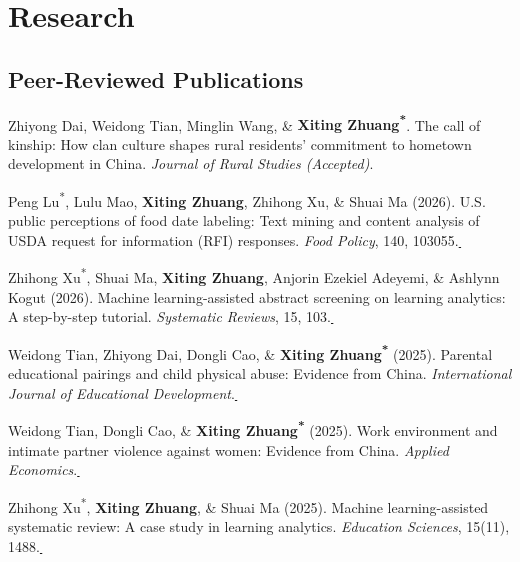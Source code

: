 \documentclass[10.8 pt,letterpaper]{article}
\newcommand{\corrauthor}{\textsuperscript{*}}
\newcommand{\paperlink}[1]{\href{#1}{\,\small\faExternalLink}}
\renewenvironment{itemize}{
	\begin{list}{}{
			\setlength{\leftmargin}{1.5em}
		}
	}{
	\end{list}
}
\begin{document}
	\section*{\textbf{Research}}
	
	\subsection*{\textbf{Peer-Reviewed Publications}}
	\begin{itemize}
		
		\item[-] Zhiyong Dai, Weidong Tian, Minglin Wang, \& \textbf{Xiting Zhuang\corrauthor}. The call of kinship: How clan culture shapes rural residents' commitment to hometown development in China. \emph{\textit{Journal of Rural Studies} (Accepted)}.
				
				
		\item[-] Peng Lu\corrauthor, Lulu Mao, \textbf{Xiting Zhuang}, Zhihong Xu, \& Shuai Ma (2026). U.S. public perceptions of food date labeling: Text mining and content analysis of USDA request for information (RFI) responses. \textit{Food Policy}, 140, 103055.\paperlink{https://www.sciencedirect.com/science/article/abs/pii/S0306919226000229}
		
		\item[-] Zhihong Xu\corrauthor, Shuai Ma, \textbf{Xiting Zhuang}, Anjorin Ezekiel Adeyemi, \& Ashlynn Kogut (2026). 
		Machine learning-assisted abstract screening on learning analytics: A step-by-step tutorial. 
		\textit{Systematic Reviews}, 15, 103.\paperlink{https://doi.org/10.1186/s13643-026-03111-2}
		
		\item[-] Weidong Tian, Zhiyong Dai, Dongli Cao, \& \textbf{Xiting Zhuang\corrauthor} (2025). Parental educational pairings and child physical abuse: Evidence from China. \textit{International Journal of Educational Development}.\paperlink{https://doi.org/10.1016/j.ijedudev.2025.103449}
		
		\item[-] Weidong Tian, Dongli Cao, \& \textbf{Xiting Zhuang\corrauthor} (2025). Work environment and intimate partner violence against women: Evidence from China. \textit{Applied Economics}.\paperlink{https://doi.org/10.1080/00036846.2025.2590113}
		
		\item[-] Zhihong Xu\corrauthor, \textbf{Xiting Zhuang}, \& Shuai Ma (2025). Machine learning-assisted systematic review: A case study in learning analytics. \textit{Education Sciences}, 15(11), 1488.\paperlink{https://doi.org/10.3390/educsci15111488}
		

\end{itemize}
\end{document}
